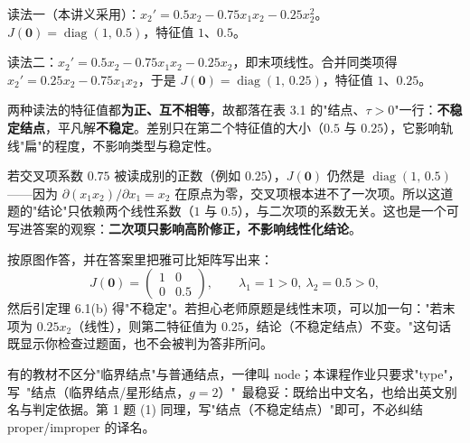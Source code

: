 \documentclass[11pt]{ctexart}
\newcommand{\Jac}{J}
\begin{document}

读法一（本讲义采用）：$x_2'=0.5x_2-0.75x_1x_2-0.25x_2^{2}$。$\Jac(\mathbf{0})=\operatorname{diag}(1,\,0.5)$，特征值 $1$、$0.5$。

读法二：$x_2'=0.5x_2-0.75x_1x_2-0.25x_2$，即末项线性。合并同类项得 $x_2'=0.25x_2-0.75x_1x_2$，于是 $\Jac(\mathbf{0})=\operatorname{diag}(1,\,0.25)$，特征值 $1$、$0.25$。

两种读法的特征值都\textbf{为正、互不相等}，故都落在表 3.1 的"结点、$\tau>0$"一行：\textbf{不稳定结点}，平凡解\textbf{不稳定}。差别只在第二个特征值的大小（$0.5$ 与 $0.25$），它影响轨线"扁"的程度，不影响类型与稳定性。


若交叉项系数 $0.75$ 被读成别的正数（例如 $0.25$），$\Jac(\mathbf{0})$ 仍然是 $\operatorname{diag}(1,\,0.5)$——因为 $\partial(x_1x_2)/\partial x_1=x_2$ 在原点为零，交叉项根本进不了一次项。所以这道题的"结论"只依赖两个线性系数（$1$ 与 $0.5$），与二次项的系数无关。这也是一个可写进答案的观察：\textbf{二次项只影响高阶修正，不影响线性化结论}。


按原图作答，并在答案里把雅可比矩阵写出来：
\[
\Jac(\mathbf{0})=\begin{pmatrix}1&0\\0&0.5\end{pmatrix},\qquad \lambda_1=1>0,\ \lambda_2=0.5>0,
\]
然后引定理 6.1(b) 得"不稳定"。若担心老师原题是线性末项，可以加一句："若末项为 $0.25x_2$（线性），则第二特征值为 $0.25$，结论（不稳定结点）不变。"这句话既显示你检查过题面，也不会被判为答非所问。


有的教材不区分"临界结点"与普通结点，一律叫 node；本课程作业只要求"type"，写\ "结点（临界结点/星形结点，$g=2$）"\ 最稳妥：既给出中文名，也给出英文别名与判定依据。第 1 题 (1) 同理，写"结点（不稳定结点）"即可，不必纠结 proper/improper 的译名。

\flowerrule
\end{document}

